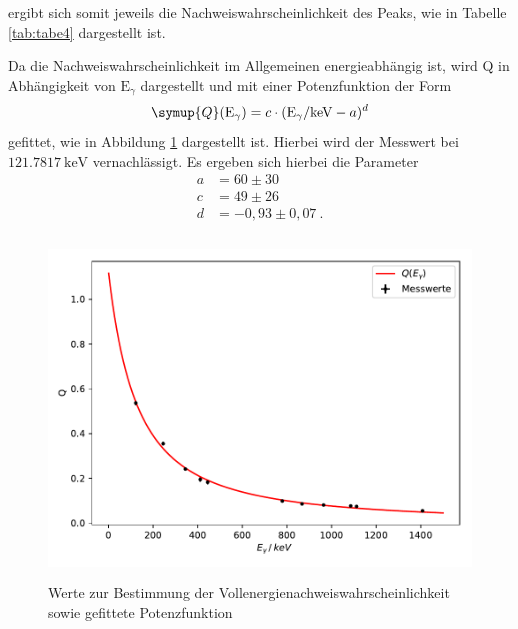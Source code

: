 ergibt sich somit jeweils die Nachweiswahrscheinlichkeit des Peaks, wie in Tabelle
\ref{tab:tabe4} dargestellt ist.

Da die Nachweiswahrscheinlichkeit im Allgemeinen energieabhängig ist, wird Q in
Abhängigkeit von $ \text{E}_{\gamma} $ dargestellt und mit einer Potenzfunktion der Form
\begin{equation}
  \symup{Q}(\text{E}_{\gamma}) = c\cdot (\text{E}_{\gamma}/\si{\kilo\electronvolt}-a)^{d}
  \label{eqn:ven2}
\end{equation}
gefittet, wie in Abbildung \ref{fig:plot4} dargestellt ist. Hierbei wird der Messwert
bei $\SI{121.7817}{\kilo\electronvolt}$ vernachlässigt.
Es ergeben sich hierbei die Parameter
\begin{align*}
  a &= 60 \pm 30 \\
  c &= 49 \pm 26 \\
  d &= -0,93 \pm 0,07 \: .
\end{align*}
\begin{figure}
  \centering
  \includegraphics[height=9cm]{plot4.pdf}
  \caption{Werte zur Bestimmung der Vollenergienachweiswahrscheinlichkeit sowie gefittete Potenzfunktion}
  \label{fig:plot4}
\end{figure}

